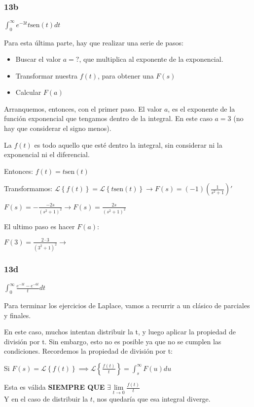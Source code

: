 \documentclass[11pt]{article}
\def\sen{\mathrm{sen}}
\newcommand{\lapl}[1]{\mathscr{L} \left\lbrace {#1} \right\rbrace}
\begin{document}
	\subsubsection{13b}
	$\displaystyle \int_{0}^{\infty}e^{-3t}t\sen(t)dt$
	
	Para esta última parte, hay que realizar una serie de pasos:
	\begin{itemize}
		\item Buscar el valor $a=?$, que multiplica al exponente de la exponencial.
		\item Transformar nuestra $f(t)$, para obtener una $F(s)$
		\item Calcular $F(a)$
	\end{itemize}

	Arranquemos, entonces, con el primer paso. El valor $a$, es el exponente de la función exponencial que tengamos dentro de la integral. En este caso $a=3$ (no hay que considerar el signo menos).
	
	La $f(t)$ es todo aquello que esté dentro la integral, sin considerar ni la exponencial ni el diferencial.
	
	Entonces: $f(t)=t\sen(t)$
	
	Transformamos: $\displaystyle \lapl{f(t)}=\lapl{t\sen(t)} \rightarrow F(s)=(-1)\left(\frac{1}{s^2+1}\right)'$
	
	$\displaystyle F(s)=-\frac{-2s}{(s^2+1)^2}\rightarrow F(s)=\frac{2s}{(s^2+1)^2}$
	
	El ultimo paso es hacer $F(a)$:
	
	$\displaystyle F(3)=\frac{2\cdot3}{(3^2+1)^2} \rightarrow $ 
	
	\subsubsection{13d}	
	$\displaystyle \int_{0}^{\infty}\frac{e^{-3t}-e^{-6t}}{t}dt$
	
	Para terminar los ejercicios de Laplace, vamos a recurrir a un clásico de parciales y finales.
	
	En este caso, muchos intentan distribuir la t, y luego aplicar la propiedad de división por t. Sin embargo, esto no es posible ya que no se cumplen las condiciones. Recordemos la propiedad de división por t:
	
	Si $\displaystyle F(s)=\lapl{f(t)} \implies \lapl{\frac{f(t)}{t}}=\int_{s}^{\infty}F(u)du$
	
	Esta es válida \textbf{SIEMPRE QUE } $\displaystyle \exists \lim\limits_{t\rightarrow0}\frac{f(t)}{t}$\\
	Y en el caso de distribuir la $t$, nos quedaría que esa integral diverge.
	
\end{document}
